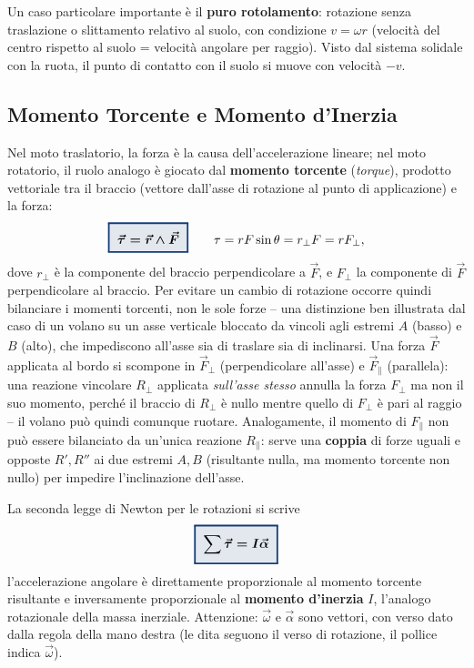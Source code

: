 \documentclass[a4paper,11pt]{article}
\newcommand{\keyeq}[1]{{\setlength{\fboxsep}{6pt}\setlength{\fboxrule}{1.3pt}\fcolorbox{chapblue}{chapblue!12}{\boldmath$\displaystyle #1$}}}
\begin{document}
Un caso particolare importante è il \textbf{puro rotolamento}: rotazione senza traslazione o slittamento relativo al suolo, con condizione $v=\omega r$ (velocità del centro rispetto al suolo = velocità angolare per raggio). Visto dal sistema solidale con la ruota, il punto di contatto con il suolo si muove con velocità $-v$.

\subsection{Momento Torcente e Momento d'Inerzia}

Nel moto traslatorio, la forza è la causa dell'accelerazione lineare; nel moto rotatorio, il ruolo analogo è giocato dal \textbf{momento torcente} (\emph{torque}), prodotto vettoriale tra il braccio (vettore dall'asse di rotazione al punto di applicazione) e la forza:
\[
\keyeq{\vec\tau = \vec r \wedge \vec F} \qquad \tau = rF\sin\theta = r_\perp F = rF_\perp,
\]
dove $r_\perp$ è la componente del braccio perpendicolare a $\vec F$, e $F_\perp$ la componente di $\vec F$ perpendicolare al braccio. Per evitare un cambio di rotazione occorre quindi bilanciare i momenti torcenti, non le sole forze -- una distinzione ben illustrata dal caso di un volano su un asse verticale bloccato da vincoli agli estremi $A$ (basso) e $B$ (alto), che impediscono all'asse sia di traslare sia di inclinarsi. Una forza $\vec F$ applicata al bordo si scompone in $\vec F_\perp$ (perpendicolare all'asse) e $\vec F_\parallel$ (parallela): una reazione vincolare $R_\perp$ applicata \emph{sull'asse stesso} annulla la forza $F_\perp$ ma non il suo momento, perché il braccio di $R_\perp$ è nullo mentre quello di $F_\perp$ è pari al raggio -- il volano può quindi comunque ruotare. Analogamente, il momento di $F_\parallel$ non può essere bilanciato da un'unica reazione $R_\parallel$: serve una \textbf{coppia} di forze uguali e opposte $R',R''$ ai due estremi $A,B$ (risultante nulla, ma momento torcente non nullo) per impedire l'inclinazione dell'asse.

La seconda legge di Newton per le rotazioni si scrive
\[
\keyeq{\sum\vec\tau = I\vec\alpha}
\]
l'accelerazione angolare è direttamente proporzionale al momento torcente risultante e inversamente proporzionale al \textbf{momento d'inerzia} $I$, l'analogo rotazionale della massa inerziale. Attenzione: $\vec\omega$ e $\vec\alpha$ sono vettori, con verso dato dalla regola della mano destra (le dita seguono il verso di rotazione, il pollice indica $\vec\omega$).
\end{document}
